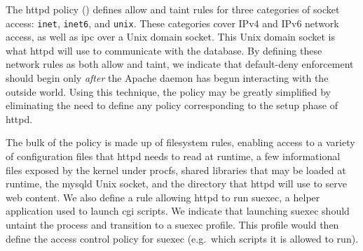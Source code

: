 The httpd policy () defines allow and taint rules for three
categories of socket access: \texttt{inet}, \texttt{inet6}, and \texttt{unix}. These
categories cover IPv4 and IPv6 network access, as well as \gls{ipc} over a Unix domain
socket. This Unix domain socket is what httpd will use to communicate with the database.
By defining these network rules as both allow and taint, we indicate that default-deny
enforcement should begin only \textit{after} the Apache daemon has begun interacting with
the outside world. Using this technique, the \bpfbox{} policy may be greatly simplified by
eliminating the need to define any policy corresponding to the setup phase of httpd.

The bulk of the \bpfbox{} policy is made up of filesystem rules, enabling access to
a variety of configuration files that httpd needs to read at runtime, a few informational
files exposed by the kernel under procfs, shared libraries that may be loaded at runtime,
the mysqld Unix socket, and the directory that httpd will use to serve web content. We
also define a rule allowing httpd to run suexec, a helper application used to launch
\gls{cgi} scripts.  We indicate that launching suexec should untaint the process and
transition to a suexec profile.  This profile would then define the access control policy
for suexec (e.g.\ which scripts it is allowed to run).

